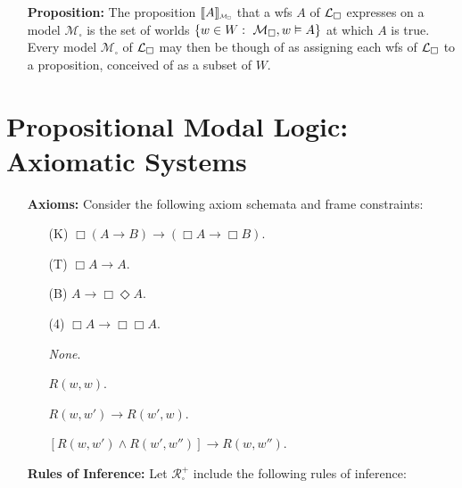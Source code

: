 \documentclass[a4paper, 11pt]{article} %
\newcommand*{\Scale}[2][4]{\scalebox{#1}{$#2$}}%
\begin{document}
\begin{enumerate}[leftmargin=1.2in,labelsep=.15in]
\begin{small}
\begin{itemize}[leftmargin=.36in]
\end{itemize}
\end{small}
\item[\bf Proposition:] The proposition $\interpret{A}_{\Scale[0.5]{\mathcal{M}_\square}}$ that a wfs ${A}$ of $\mathcal{L}_\square$ expresses on a model $\mathcal{M}_\square$ is the set of worlds $\lbrace w\in W: ~\mathcal{M}_\square,w\vDash  A\rbrace$ at which ${A}$ is true. Every model $\mathcal{M}_\square$ of $\mathcal{L}_\square$ may then be though of as assigning each wfs of $\mathcal{L}_\square$ to a proposition, conceived of as a subset of $W$.
\end{enumerate}



\section*{\sc Propositional Modal Logic: Axiomatic Systems}

\begin{enumerate}[leftmargin=1.2in,labelsep=.15in] %
\item[\bf Axioms:] Consider the following axiom schemata and frame constraints:\vspace{-.05in}
	\begin{multicols}{2}
	\begin{enumerate}
	\item[(K)] $\Box(A\rightarrow B)\rightarrow(\Box A\rightarrow\Box B)$.
	\item[(T)] $\Box A\rightarrow A$.
	\item[(B)] $A\rightarrow\Box\Diamond A$.
	\item[(4)] $\Box A\rightarrow\Box\Box A$.
	
	\item[] \textit{None}.
	\item[] $R(w,w)$.
	\item[] $R(w,w')\rightarrow R(w',w)$.
	\item[] $[R(w,w')\wedge R(w',w'')]{\rightarrow}R(w,w'')$.
	\end{enumerate}
	\end{multicols}
\item[\bf Rules of Inference:] Let $\mathcal{R}_\square^+$ include the following rules of inference:
\end{enumerate}
	
\end{document}
